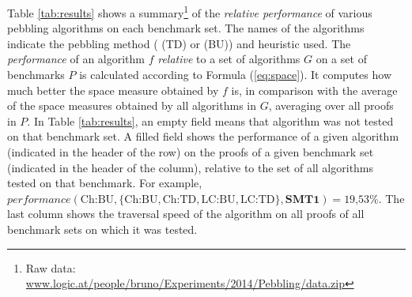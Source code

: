 \documentclass{llncs}
\begin{document}
Table \ref{tab:results} shows a summary\footnote{Raw data: \url{www.logic.at/people/bruno/Experiments/2014/Pebbling/data.zip}} of the \emph{relative performance} of various pebbling algorithms on each benchmark set. The names of the algorithms indicate the pebbling method ( (TD) or  (BU)) and heuristic used.
The \emph{performance} of an algorithm $f$ \emph{relative} to a set of algorithms $G$ on a set of benchmarks $P$ is calculated according to Formula (\ref{eq:space}). It computes how much better the space measure obtained by $f$ is, in comparison with the average of the space measures obtained by all algorithms in $G$, averaging over all proofs in $P$. In Table \ref{tab:results}, an empty field means that algorithm was not tested on that benchmark set. A filled field shows the performance of a given algorithm (indicated in the header of the row) on the proofs of a given benchmark set (indicated in the header of the column), relative to the set of all algorithms tested on that benchmark. For example, $\mathit{performance}(\textrm{Ch:BU},\{ \textrm{Ch:BU}, \textrm{Ch:TD}, \textrm{LC:BU}, \textrm{LC:TD}\}, \textbf{SMT1}) = \textrm{19,53\%}$. The last column shows the traversal speed of the algorithm on all proofs of all benchmark sets on which it was tested.
\end{document}
